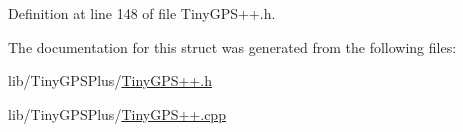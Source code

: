 Definition at line 148 of file Tiny\+G\+P\+S++.\+h.



The documentation for this struct was generated from the following files\+:\begin{DoxyCompactItemize}
\item 
lib/\+Tiny\+G\+P\+S\+Plus/\hyperlink{_tiny_g_p_s_09_09_8h}{Tiny\+G\+P\+S++.\+h}\item 
lib/\+Tiny\+G\+P\+S\+Plus/\hyperlink{_tiny_g_p_s_09_09_8cpp}{Tiny\+G\+P\+S++.\+cpp}\end{DoxyCompactItemize}
